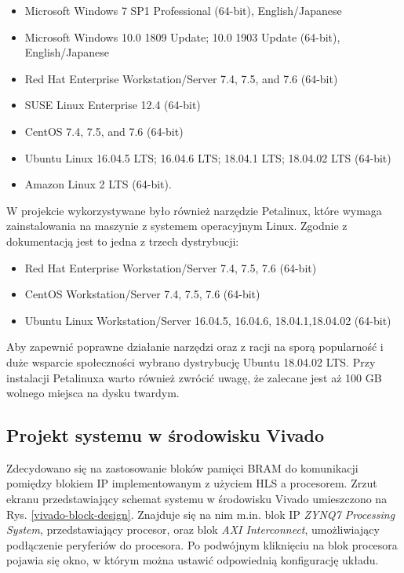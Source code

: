 \begin{itemize}
  \item Microsoft Windows 7 SP1 Professional (64-bit), English/Japanese 
  \item Microsoft Windows 10.0 1809 Update; 10.0 1903 Update (64-bit), English/Japanese
  \item Red Hat Enterprise Workstation/Server 7.4, 7.5, and 7.6 (64-bit)
  \item SUSE Linux Enterprise 12.4 (64-bit)
  \item CentOS 7.4, 7.5, and 7.6 (64-bit)
  \item Ubuntu Linux 16.04.5 LTS; 16.04.6 LTS; 18.04.1 LTS; 18.04.02 LTS (64-bit)
  \item Amazon Linux 2 LTS (64-bit).
\end{itemize}

\bigskip
W projekcie wykorzystywane było również narzędzie Petalinux, które wymaga 
zainstalowania na maszynie z systemem operacyjnym Linux. Zgodnie z 
dokumentacją\cite{PetalinuxGuide} jest to jedna z trzech dystrybucji:

\begin{itemize}
\item Red Hat Enterprise Workstation/Server 7.4, 7.5, 7.6 (64-bit)
\item CentOS Workstation/Server 7.4, 7.5, 7.6 (64-bit)
\item Ubuntu Linux Workstation/Server 16.04.5, 16.04.6, 18.04.1,18.04.02 (64-bit)
\end{itemize}

\bigskip
Aby zapewnić poprawne działanie narzędzi oraz z racji na sporą popularność i duże 
wsparcie społeczności wybrano dystrybucję Ubuntu 18.04.02 LTS. Przy instalacji 
Petalinuxa warto również zwrócić uwagę, że zalecane jest aż 100 GB wolnego miejsca 
na dysku twardym. 

\subsection{Projekt systemu w środowisku Vivado}

Zdecydowano się na zastosowanie bloków pamięci BRAM do komunikacji pomiędzy 
blokiem IP implementowanym z użyciem HLS a procesorem. Zrzut ekranu przedstawiający 
schemat systemu w środowisku Vivado umieszczono na Rys. \ref{vivado-block-design}.
Znajduje się na nim m.in. blok IP \emph{ZYNQ7 Processing System}, przedstawiający 
procesor, oraz blok \emph{AXI Interconnect}, umożliwiający podłączenie peryferiów 
do procesora. Po podwójnym kliknięciu na blok procesora pojawia się okno, w którym
można ustawić odpowiednią konfigurację układu. 

